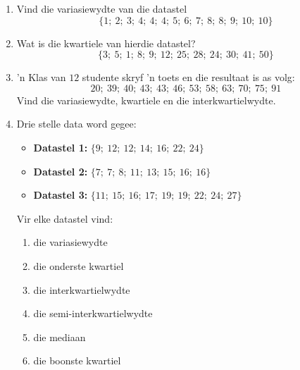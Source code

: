 \begin{exercises}{}{
  \begin{enumerate}[noitemsep, label=\textbf{\arabic*}.]

  \item Vind die variasiewydte van die datastel
    \begin{equation*}
      \{1;\ 2;\ 3;\ 4;\ 4;\ 4;\ 5;\ 6;\ 7;\ 8;\ 8;\ 9;\ 10;\ 10\}
    \end{equation*}

  \item Wat is die kwartiele van hierdie datastel?
    \begin{equation*}
      \{3;\ 5;\ 1;\ 8;\ 9;\ 12;\ 25;\ 28;\ 24;\ 30;\ 41;\ 50\}
    \end{equation*}

  \item ’n Klas van $12$ studente skryf ’n toets en die resultaat is as volg:
    \begin{equation*}
      20;\ 39;\ 40;\ 43;\ 43;\ 46;\ 53;\ 58;\ 63;\ 70;\ 75;\ 91
    \end{equation*}
    Vind die variasiewydte, kwartiele en die interkwartielwydte.

  \item Drie stelle data word gegee:
    \begin{itemize}  
    \item \textbf{Datastel 1:} $\{9;\ 12;\ 12;\ 14;\ 16;\ 22;\ 24\}$
    \item \textbf{Datastel 2:} $\{7;\ 7;\ 8;\ 11;\ 13;\ 15;\ 16;\ 16\}$
    \item \textbf{Datastel 3:} $\{11;\ 15;\ 16;\ 17;\ 19;\ 19;\ 22;\ 24;\ 27\}$
    \end{itemize}
    Vir elke datastel vind:
    \begin{enumerate}[noitemsep, label=\textbf{(\alph*)} ]
    \item die variasiewydte
    \item die onderste kwartiel
    \item die interkwartielwydte
    \item die semi-interkwartielwydte
    \item die mediaan
    \item die boonste kwartiel
    \end{enumerate}
  \end{enumerate}
}
\end{exercises}



